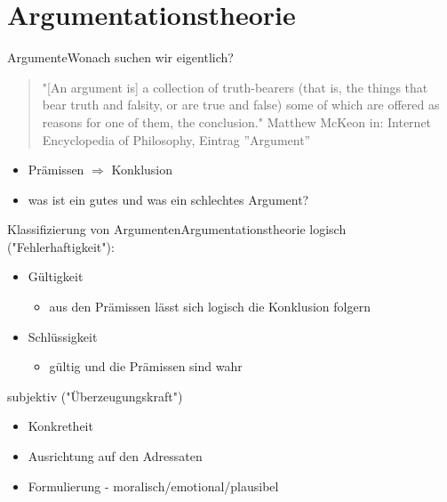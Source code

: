 \documentclass{beamer}
\begin{document}
	\section{Argumentationstheorie}
	\begin{frame}{Argumente}{Wonach suchen wir eigentlich?}
		\begin{quote}
			"[An argument is] a collection of truth-bearers (that is, the things that bear truth and falsity, or are true and false) some of which are offered as reasons for one of them, the conclusion."
			\flushright \tiny Matthew McKeon in: Internet Encyclopedia of Philosophy, Eintrag ''Argument''
		\end{quote}
		\begin{itemize}[<+->]
			\item Prämissen $\Rightarrow$ Konklusion
			\item was ist ein gutes und was ein schlechtes Argument?
		\end{itemize}
	\end{frame}
	\begin{frame}{Klassifizierung von Argumenten}{Argumentationstheorie}
		logisch ("Fehlerhaftigkeit"):
		\begin{itemize}[<+->]
			\item Gültigkeit
			\begin{itemize}
				\item aus den Prämissen lässt sich logisch die Konklusion folgern
			\end{itemize}
			\item Schlüssigkeit
			\begin{itemize}
				\item gültig und die Prämissen sind wahr
			\end{itemize}
		\end{itemize}
		subjektiv ("Überzeugungskraft")		\begin{itemize}[<+->]
			\item Konkretheit
			\item Ausrichtung auf den Adressaten
			\item Formulierung - moralisch/emotional/plausibel
		\end{itemize}
	\end{frame}
\end{document}
